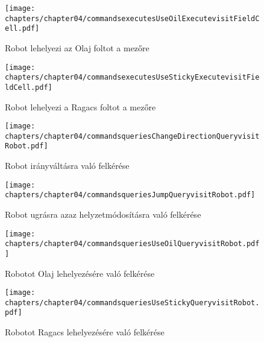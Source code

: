 \begin{figure}[h]
	\begin{center}
		\texttt{[image: chapters/chapter04/commandsexecutesUseOilExecutevisitFieldCell.pdf]}
		\caption{Robot lehelyezi az Olaj foltot a mezőre}
		\label{fig:command.executes.UseOilExecute.visit}
	\end{center}
\end{figure}

\begin{figure}[h]
	\begin{center}
		\texttt{[image: chapters/chapter04/commandsexecutesUseStickyExecutevisitFieldCell.pdf]}
		\caption{Robot lehelyezi a Ragacs foltot a mezőre}
		\label{fig:command.executes.UseStickyExecute.visit}
	\end{center}
\end{figure}

\clearpage

\begin{figure}[h]
	\begin{center}
		\texttt{[image: chapters/chapter04/commandsqueriesChangeDirectionQueryvisitRobot.pdf]}
		\caption{Robot irányváltásra való felkérése}
		\label{fig:command.executes.ChangeDirectionQuery.visit}
	\end{center}
\end{figure}


\begin{figure}[h]
	\begin{center}
		\texttt{[image: chapters/chapter04/commandsqueriesJumpQueryvisitRobot.pdf]}
		\caption{Robot ugrásra azaz helyzetmódosításra való felkérése}
		\label{fig:command.executes.JumpQuery.visit}
	\end{center}
\end{figure}

\begin{figure}[h]
	\begin{center}
		\texttt{[image: chapters/chapter04/commandsqueriesUseOilQueryvisitRobot.pdf]}
		\caption{Robotot Olaj lehelyezésére való felkérése}
		\label{fig:command.executes.UseOilQuery.visit}
	\end{center}
\end{figure}

\begin{figure}[h]
	\begin{center}
		\texttt{[image: chapters/chapter04/commandsqueriesUseStickyQueryvisitRobot.pdf]}
		\caption{Robotot Ragacs lehelyezésére való felkérése}
		\label{fig:command.executes.UseStickyQuery.visit}
	\end{center}
\end{figure}

